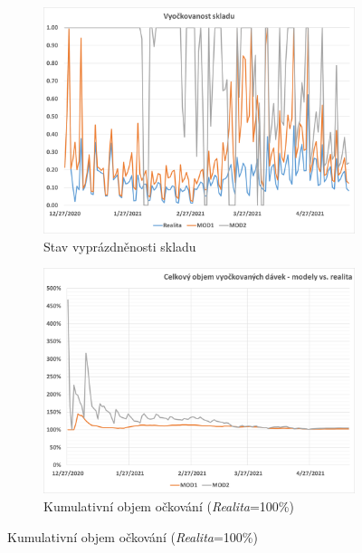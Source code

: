 \begin{figure}
\centering


\begin{subfigure}{0.45\textwidth}
\includegraphics[width=\textwidth]{assets/sklad_vyockovanost}
\caption{Stav vyprázdněnosti skladu}
\label{gr_mod_vyockovanost}
\end{subfigure}
%
\begin{subfigure}{0.45\textwidth}
\includegraphics[width=\textwidth]{assets/modely_vs_realita}
\caption{Kumulativní objem očkování (\emph{Realita}=100\%)}
\label{gr_models_delta}
\end{subfigure}




\end{figure}
